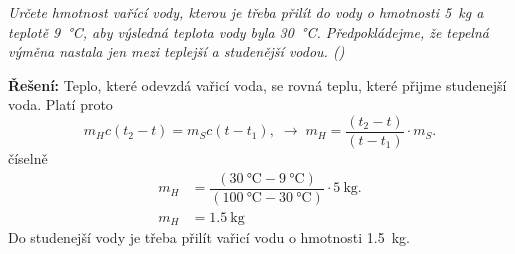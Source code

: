 \begin{mdframed}[style=mdexam]
  \begin{example}\label{FYZ:exam032}
    \emph{Určete hmotnost vařící vody, kterou je třeba přilít do vody o hmotnosti \SI{5}{\kg} a
    teplotě \SI{9}{\degreeCelsius}, aby výsledná teplota vody byla \SI{30}{\degreeCelsius}.
    Předpokládejme, že tepelná výměna nastala jen mezi teplejší a studenější vodou. 
     (\cite[s.~33]{Bartuska1997})}
    
    \textbf{Řešení:}\newline 
    Teplo, které odevzdá vařicí voda, se rovná teplu, které přijme studenejší voda. Platí proto
    \begin{equation*}
      m_Hc(t_2 - t) = m_Sc(t-t_1), \;\rightarrow\; m_H = \dfrac{(t_2 - t)}{(t-t_1)}\cdot m_S.
    \end{equation*}
    číselně
    \begin{align*}
      m_H &= \dfrac{(\SI{30}{\degreeCelsius}  -  \SI{9}{\degreeCelsius})}
                  {(\SI{100}{\degreeCelsius} - \SI{30}{\degreeCelsius})}\cdot\SI{5}{\kg}.         \\
      m_H &= \SI{1.5}{\kg}
    \end{align*}
    Do studenejší vody je třeba přilít vařicí vodu o hmotnosti \SI{1.5}{\kg}.  
  \end{example} 
\end{mdframed}